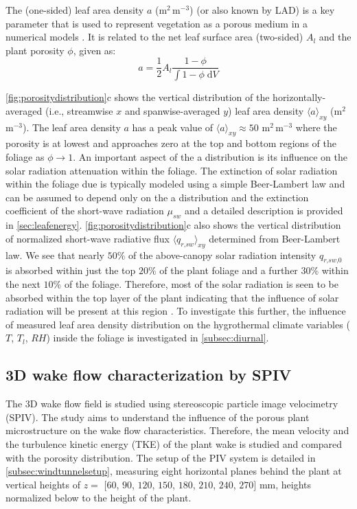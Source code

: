The (one-sided) leaf area density $a$ (m$^2$\,m$^{-3}$) (or also known by LAD) is a key parameter that is used to represent vegetation as a porous medium in a numerical models \citep{DeLangre2008,Gross1987,Manickathan2018a}. It is related to the net leaf surface area (two-sided) $A_l$ and the plant porosity $\phi$, given as:
\begin{equation}
a = \frac{1}{2}{A_l}\frac{{1 - \phi }}{{\int {1 - \phi \;{\mathrm{d}}V} }}
\end{equation}

\cref{fig:porositydistribution}c shows the vertical distribution of the horizontally-averaged (i.e., streamwise $x$ and spanwise-averaged $y$) leaf area density $\langle a \rangle_{\textit{xy}}$ (m$^2$\,m$^{-3}$). The leaf area density $a$ has a peak value of $\langle a \rangle_{\textit{xy}}\approx50$ m$^2$\,m$^{-3}$ where the porosity is at lowest and approaches zero at the top and bottom regions of the foliage as $\phi\rightarrow1$. An important aspect of the a distribution is its influence on the solar radiation attenuation within the foliage. The extinction of solar radiation within the foliage due is typically modeled using a simple Beer-Lambert law and can be assumed to depend only on the a distribution and the extinction coefficient of the short-wave radiation $\mu_{\textit{sw}}$ \citep{Manickathan2018a}
and a detailed description is provided in \cref{sec:leafenergy}. \cref{fig:porositydistribution}c also shows the vertical distribution of normalized short-wave radiative flux $\langle q_{\textit{r,sw}} \rangle_{\textit{xy}}$ determined from Beer-Lambert law. We see that nearly $50\%$ of the above-canopy solar radiation intensity $q_{\textit{r,sw,0}}$ is absorbed within just the top $20\%$ of the plant foliage and a further $30\%$ within the next $10\%$ of the foliage. Therefore, most of the solar radiation is seen to be absorbed within the top layer of the plant indicating that the influence of solar radiation will be present at this region \citep{Manickathan2018a}. To investigate this further, the influence of measured leaf area density distribution on the hygrothermal climate variables ($T$, $T_l$, $\textit{RH}$) inside the foliage is investigated in \cref{subsec:diurnal}.


\subsection{3D wake flow characterization by SPIV}
\label{subsec:stereopiv}

The 3D wake flow field is studied using stereoscopic particle image velocimetry (SPIV). The study aims to understand the influence of the porous plant microstructure on the wake flow characteristics. Therefore, the mean velocity and the turbulence kinetic energy (TKE) of the plant wake is studied and compared with the porosity distribution. The setup of the PIV system is detailed in \cref{subsec:windtunnelsetup}, measuring eight horizontal planes behind the plant at vertical heights of $z =$ $[60$, $90$, $120$, $150$, $180$, $210$, $240$, $270]$ mm, heights normalized below to the height of the plant.

